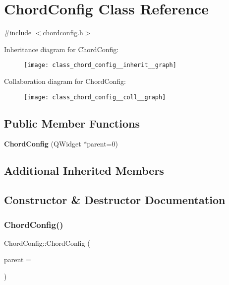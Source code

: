 \section{Chord\+Config Class Reference}
\label{class_chord_config}


{\ttfamily \#include $<$chordconfig.\+h$>$}



Inheritance diagram for Chord\+Config\+:\nopagebreak
\begin{figure}[H]
\begin{center}
\leavevmode
\texttt{[image: class\_chord\_config\_\_inherit\_\_graph]}
\end{center}
\end{figure}


Collaboration diagram for Chord\+Config\+:\nopagebreak
\begin{figure}[H]
\begin{center}
\leavevmode
\texttt{[image: class\_chord\_config\_\_coll\_\_graph]}
\end{center}
\end{figure}
\subsection*{Public Member Functions}
\begin{DoxyCompactItemize}
\item 
\textbf{ Chord\+Config} (Q\+Widget $\ast$parent=0)
\end{DoxyCompactItemize}
\subsection*{Additional Inherited Members}


\subsection{Constructor \& Destructor Documentation}
\mbox{\label{class_chord_config_a650f5c9d66d1c5e8a86c376b58dd0232}} 
\subsubsection{Chord\+Config()}
{\footnotesize\ttfamily Chord\+Config\+::\+Chord\+Config (\begin{DoxyParamCaption}\item[{Q\+Widget $\ast$}]{parent = {} }\end{DoxyParamCaption})}

